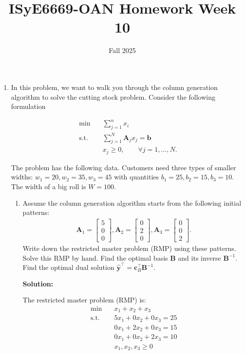 \documentclass[11pt]{article}
\title{ISyE6669-OAN Homework Week 10}
\author{Fall 2025}
\date{}
\newcommand{\mb}[1]{\ensuremath{\boldsymbol{#1}}}
\begin{document}
\maketitle
\begin{enumerate}


\item In this problem, we want to walk you through the column generation algorithm to solve the cutting stock problem. Consider the following formulation

\begin{align*}
\min \quad & \sum_{j=1}^n x_i \\
\text{s.t.}\quad & \sum_{j=1}^N \mb{A}_j x_j = \mb{b} \\
& x_j \geq 0, \qquad \forall j=1,\dots, N.
\end{align*}

The problem has the following data. Customers need three types of smaller widths: $w_1 = 20, w_2 = 35, w_3 = 45$ with quantities $b_1 = 25, b_2 = 15, b_3 = 10$. The width of a big roll is $W = 100$. 
\begin{enumerate}
\item Assume the column generation algorithm starts from the following initial patterns:
\begin{align*}
\mb{A}_1 = \begin{bmatrix} 5 \\ 0 \\ 0\end{bmatrix}, \mb{A}_2 = \begin{bmatrix} 0 \\ 2 \\ 0\end{bmatrix}, \mb{A}_3 = \begin{bmatrix} 0 \\ 0 \\2\end{bmatrix}.
\end{align*}
Write down the restricted master problem (RMP) using these patterns. Solve this RMP by hand. Find the optimal basis $\mb{B}$ and its inverse $\mb{B}^{-1}$. Find the optimal dual solution $\hat{\mb{y}}^\top=\mb{c}_B^\top\mb{B}^{-1}$.

\textbf{Solution:}

The restricted master problem (RMP) is:
\begin{align*}
\min \quad & x_1 + x_2 + x_3 \\
\text{s.t.}\quad & 5x_1 + 0x_2 + 0x_3 = 25 \\
& 0x_1 + 2x_2 + 0x_3 = 15 \\
& 0x_1 + 0x_2 + 2x_3 = 10 \\
& x_1, x_2, x_3 \geq 0
\end{align*}


\end{enumerate}
\end{enumerate}
\end{document}
